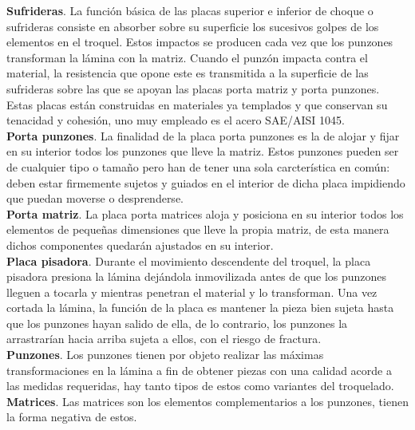 \textbf{Sufrideras}. La función básica de las placas superior e inferior de choque o sufrideras 
consiste en absorber sobre su superficie los sucesivos golpes de los elementos en el troquel. 
Estos impactos se producen cada vez que los punzones transforman la lámina con la matriz. Cuando 
el punzón impacta contra el material, la resistencia que opone este es transmitida a la 
superficie de las sufrideras sobre las que se apoyan las placas porta matriz y porta punzones. 
Estas placas están construidas en materiales ya templados y que conservan su tenacidad y cohesión, 
uno muy empleado es el acero SAE/AISI 1045.\\

\textbf{Porta punzones}. La finalidad de la placa porta punzones es la de alojar y fijar en 
su interior todos los punzones que lleve la matriz. Estos punzones pueden ser de cualquier 
tipo o tamaño pero han de tener una sola carcterística en común: deben estar firmemente 
sujetos y guiados en el interior de dicha placa impidiendo que puedan moverse o desprenderse.\\

\textbf{Porta matriz}. La placa porta matrices aloja y posiciona en su interior todos 
los elementos de pequeñas dimensiones que lleve la propia matriz, de esta manera dichos componentes 
quedarán ajustados en su interior.\\

\textbf{Placa pisadora}. Durante el movimiento descendente del troquel, la placa pisadora presiona 
la lámina dejándola inmovilizada antes de que los punzones lleguen a tocarla y mientras penetran 
el material y lo transforman. Una vez cortada la lámina, la función de la placa es mantener la 
pieza bien sujeta hasta que los punzones hayan salido de ella, de lo contrario, los punzones 
la arrastrarían hacia arriba sujeta a ellos, con el riesgo de fractura.\\

\textbf{Punzones}. Los punzones tienen por objeto realizar las máximas transformaciones en la lámina 
a fin de obtener piezas con una calidad acorde a las medidas requeridas, hay tanto tipos de estos 
como variantes del troquelado.\\

\textbf{Matrices}. Las matrices son los elementos complementarios a los punzones, tienen la forma 
negativa de estos.

